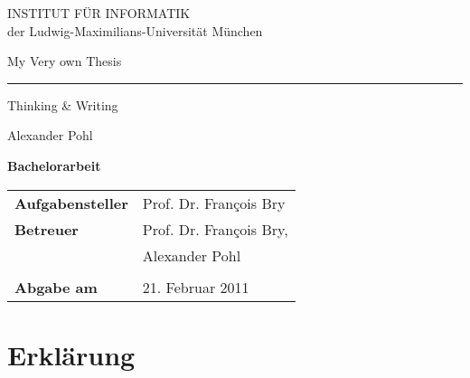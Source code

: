 \documentclass{scrbook}
\newcommand{\thesisTitle}{My Very own Thesis}
\newcommand{\thesisSubTitle}{Thinking \& Writing}
\newcommand{\typeOfThesis}{Bachelorarbeit}
\newcommand{\studentName}{Alexander Pohl}
\newcommand{\supervisor}{Prof. Dr. Fran\c{c}ois Bry}
\newcommand{\advisor}{Alexander Pohl}
\newcommand{\dateOfHandover}{21. Februar 2011}
\begin{document}
%
% 
\begin{titlepage}   
  \thispagestyle{empty} 
  \begin{adjustwidth}{3em}{3em} 
    \begin{center} 
        \vspace{5cm} 
        {\huge INSTITUT F\"UR INFORMATIK\\} 
        {\Large der Ludwig-Maximilians-Universit\"at M\"unchen} 
    \end{center} 
    \vspace{2cm} 
    \begin{center} 
      \vspace*{15em} 
      \Huge \textsc \thesisTitle \\[.5em] \hrule \vspace*{.5em} 
      \huge \thesisSubTitle 
    \end{center} 
    \vspace*{2em} 
    \begin{center} 
      \huge \studentName 
    \end{center} 
    \vspace*{12em} 
    \begin{center} 
      \Large\textbf{\typeOfThesis}
    \end{center} 
    \vspace*{.5em} 
    \begin{center} 
      \begin{tabular}{ll} 
        \textbf{Aufgabensteller} & \supervisor \\ 
        \textbf{Betreuer}        & \supervisor, \\
                                 & \advisor \\
                                 & \\
        \textbf{Abgabe am}       & \dateOfHandover                  
      \end{tabular} 
    \end{center} 
  \end{adjustwidth} 
  \cleardoublepage 
\end{titlepage} 


\chapter*{Erklärung}
\end{document}
